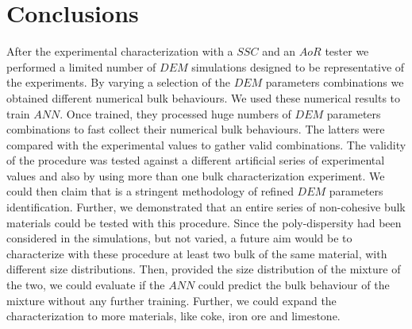 \section{Conclusions}
\label{sec:conclusions}
After the experimental characterization with a $SSC$ and an $AoR$ tester we performed a 
limited number of $DEM$ simulations designed to be representative of the experiments. 
By varying a selection of the $DEM$ parameters combinations we obtained different numerical bulk behaviours. 
We used these numerical results to train $ANN$. Once trained, they processed huge 
numbers of $DEM$ parameters combinations to fast collect their numerical bulk behaviours. 
The latters were compared with the experimental values to gather valid combinations. 
The validity of the procedure was tested against a different artificial series of experimental 
values and also by using more than one bulk characterization experiment. 
We could then claim that is a stringent methodology of refined $DEM$ parameters identification. 
Further, we demonstrated that an entire series of non-cohesive bulk materials could be tested with this procedure.
Since the poly-dispersity had been considered in the simulations, but not varied, a future aim would 
be to characterize with these procedure at least two bulk of the same material, with different size distributions. 
Then, provided the size distribution of the mixture of the two, we could evaluate if the $ANN$ could predict 
the bulk behaviour of the mixture without any further training. 
Further, we could expand the characterization to more materials, like coke, iron
ore and limestone.
